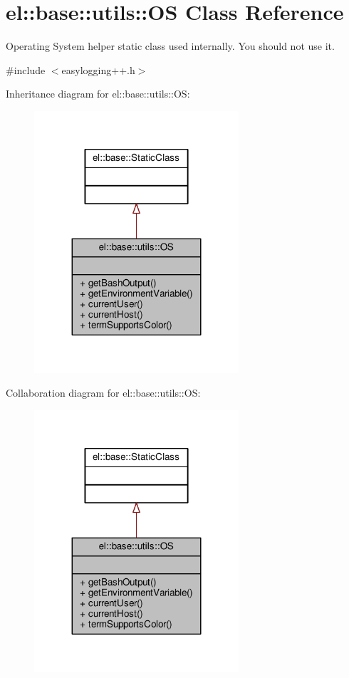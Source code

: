 \hypertarget{classel_1_1base_1_1utils_1_1OS}{}\section{el\+:\+:base\+:\+:utils\+:\+:OS Class Reference}
\label{classel_1_1base_1_1utils_1_1OS}


Operating System helper static class used internally. You should not use it.  




{\ttfamily \#include $<$easylogging++.\+h$>$}



Inheritance diagram for el\+:\+:base\+:\+:utils\+:\+:OS\+:
\nopagebreak
\begin{figure}[H]
\begin{center}
\leavevmode
\includegraphics[width=215pt]{d4/dab/classel_1_1base_1_1utils_1_1OS__inherit__graph}
\end{center}
\end{figure}


Collaboration diagram for el\+:\+:base\+:\+:utils\+:\+:OS\+:
\nopagebreak
\begin{figure}[H]
\begin{center}
\leavevmode
\includegraphics[width=215pt]{df/d99/classel_1_1base_1_1utils_1_1OS__coll__graph}
\end{center}
\end{figure}
